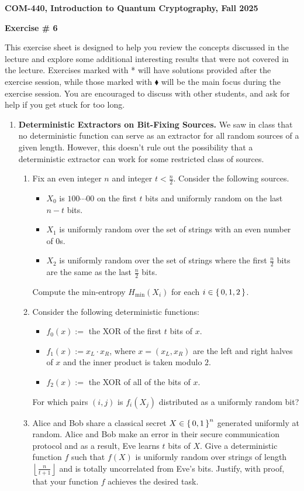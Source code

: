 \documentclass[12pt]{article}
\newcommand{\header}[1]{\begin{center} {\large\bf #1} \end{center}}
\begin{document}
\header{COM-440, Introduction to Quantum Cryptography, Fall 2025}
\header{\bf Exercise \# 6}

This exercise sheet is designed to help you review the concepts discussed in the lecture and explore some additional interesting results that were not covered in the lecture. Exercises marked with * will have solutions provided after the exercise session, while those marked with $\blacklozenge$ will be the main focus during the exercise session. You are encouraged to discuss with other students, and ask for help if you get stuck for too long.

\begin{enumerate}


\item \textbf{Deterministic Extractors on Bit-Fixing Sources.}
We saw in class that no deterministic function can serve as an extractor for all random sources of a given length. However, this doesn't rule out the possibility that a deterministic extractor can work for some restricted class of sources.
\begin{enumerate}
	\item Fix an even integer $n$ and integer $t < \frac n2$. Consider the following sources.
	\begin{itemize}
		\item $X_0$ is $100\cdots00$ on the first $t$ bits and uniformly random on the last $n-t$ bits.
		\item $X_1$ is uniformly random over the set of strings with an even number of $0$s. 
		\item $X_2$ is uniformly random over the set of strings where the first $\frac n2$ bits are the same as the last $\frac n2$ bits. 
	\end{itemize}
	Compute the min-entropy $H_\text{min}(X_i)$ for each $i\in \set{0,1,2}$.

	\item  Consider the following deterministic functions:
	\begin{itemize}
		\item $f_0(x):=$ the XOR of the first $t$ bits of $x$.
		\item $f_1(x):= x_L\cdot x_R$, where $x=(x_L,x_R)$ are the left and right halves of $x$ {and the inner product is taken modulo $2$}. 
		\item $f_2(x):=$ the XOR of all of the bits of $x$.
	\end{itemize}
	For which pairs $(i,j)$ is $f_i(X_j)$ distributed as a uniformly random bit?
	\item Alice and Bob share a classical secret $X\in \set{0,1}^n$ generated uniformly at random. Alice and Bob make an error in their secure communication protocol and as a result, Eve learns $t$ bits of $X$. Give a deterministic function $f$ such that $f(X)$ is uniformly random over strings of length $\left\lfloor\frac n{t+1}\right\rfloor$ and is totally uncorrelated from Eve's bits. Justify, with proof, that your function $f$ achieves the desired task.
\end{enumerate}

\end{enumerate}
\end{document}
